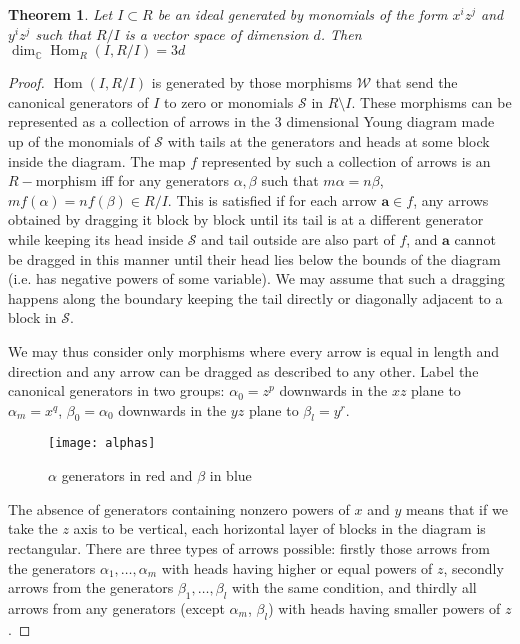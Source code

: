 \documentclass[a4page]{article}
\def\Hom{\operatorname{Hom}}
\newtheorem{theorem}{Theorem}[section]
\theoremstyle{definition}
\def\S{\mathcal{S}}
\def\W{\mathcal{W}}
\def\a{\mathbf{a}}
\begin{document}
\begin{theorem} Let $I \subset R $ be an ideal generated by monomials of the form $x^iz^j$ and $y^iz^j$
	such that $R/I$ is a vector space of dimension $d$.
Then $\dim_{\mathbb{C}} \Hom_R(I,R/I)=3d$
\end{theorem}
\begin{proof}
$\Hom(I,R/I)$ is generated by those morphisms $\W$ that send the canonical generators of $I$ to zero or monomials $\S$ in $R\setminus I$.
These morphisms can be represented as a collection of arrows in the 3 dimensional Young diagram made up of the monomials of $\S$
with tails at the generators and heads at some block inside the diagram.
The map $f$ represented by such a collection of arrows is an $R-$morphism iff for any generators $\alpha,\beta$ such that $m\alpha=n\beta$, $mf(\alpha)=nf(\beta) \in R/I$.
This is satisfied if for each arrow $\a \in f$, any arrows obtained by dragging it block by block until its tail is at a different generator
while keeping its head inside $\S$ and tail outside are also part of $f$, and $\a$
cannot be dragged in this manner until their head lies below the bounds of the diagram (i.e.
has negative powers of some variable).
We may assume that such a dragging happens along the boundary keeping the tail directly or diagonally adjacent to a block in $\S$.

We may thus consider only morphisms where every arrow is equal in length and direction and any arrow can be dragged as described to any other.
Label the canonical generators in two groups: $\alpha_0=z^p$ downwards in the $xz$ plane to $\alpha_m=x^q$, $\beta_0=\alpha_0$ downwards in the $yz$ plane to $\beta_l=y^r$.

\begin{figure}
\centering
\texttt{[image: alphas]}
\caption{$\alpha$ generators in red and $\beta$ in blue}
\label{fig:gens}
\end{figure}

The absence of generators containing nonzero powers of $x$ and $y$ means that if we take the $z$ axis to be vertical, each horizontal layer of blocks in the diagram is rectangular.
There are three types of arrows possible: firstly those arrows from the generators $\alpha_1, \dots, \alpha_m$ with heads having higher or equal powers of $z$,
secondly arrows from the generators $\beta_1, \dots, \beta_l$ with the same condition,
and thirdly all arrows from any generators (except $\alpha_m$, $\beta_l$) with heads having smaller powers of $z$.


\end{proof}
\end{document}
